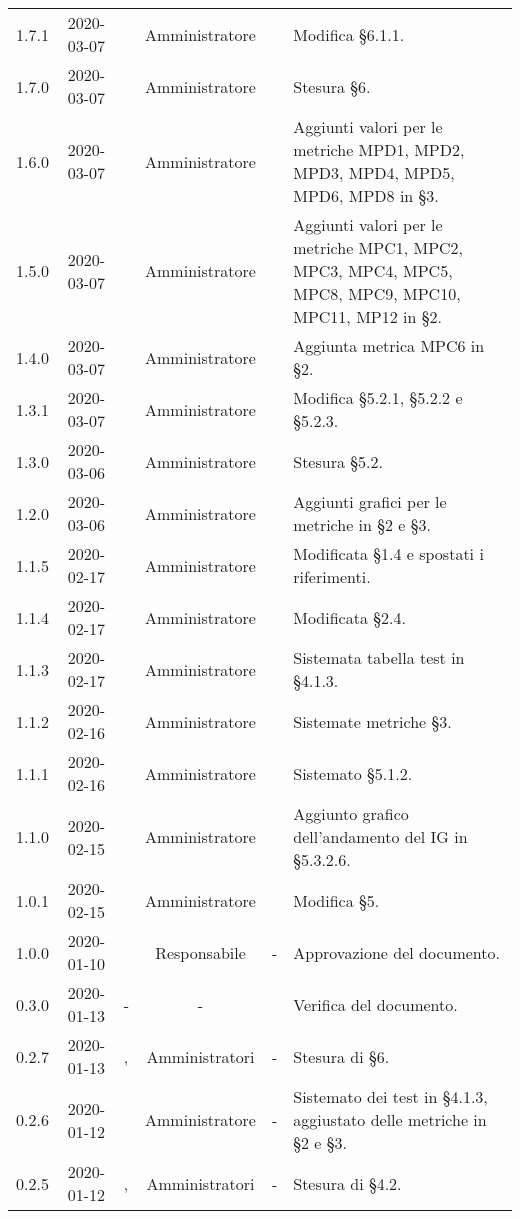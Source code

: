 {\begin{longtable}{ c c  C{2.3cm} c C{3cm} C{3.2cm}}
1.7.1 & 2020-03-07 & \DF{} & Amministratore & \SE{} & Modifica §6.1.1. \\
1.7.0 & 2020-03-07 & \CE{} & Amministratore & \SE{} & Stesura §6. \\
1.6.0 & 2020-03-07 & \CE{} & Amministratore & \AT{} & Aggiunti valori per le metriche MPD1, MPD2, MPD3, MPD4, MPD5, MPD6, MPD8 in §3. \\
1.5.0 & 2020-03-07 & \PF{} & Amministratore & \AT{} & Aggiunti valori per le metriche MPC1, MPC2, MPC3, MPC4, MPC5, MPC8, MPC9, MPC10, MPC11, MP12 in §2. \\
1.4.0 & 2020-03-07 & \DF{} & Amministratore & \AT{} & Aggiunta metrica MPC6 in §2. \\
1.3.1 & 2020-03-07 & \CE{} & Amministratore & \SE{} & Modifica §5.2.1, §5.2.2 e §5.2.3. \\
1.3.0 & 2020-03-06 & \PF{} & Amministratore & \AT{} & Stesura §5.2. \\
1.2.0 & 2020-03-06 & \PF{} & Amministratore & \SE{} & Aggiunti grafici per le metriche in §2 e §3. \\
1.1.5 & 2020-02-17 & \CE{} & Amministratore & \AT{} & Modificata §1.4 e spostati i riferimenti. \\
1.1.4 & 2020-02-17 & \PF{} & Amministratore & \AT{} & Modificata §2.4. \\
1.1.3 & 2020-02-17 & \DF{} & Amministratore & \AT{} & Sistemata tabella test in §4.1.3. \\
1.1.2 & 2020-02-16 & \CE{} & Amministratore & \SE{} & Sistemate metriche §3. \\
1.1.1 & 2020-02-16 & \PF{} & Amministratore & \AT{} & Sistemato §5.1.2. \\
1.1.0 & 2020-02-15 & \PF{} & Amministratore & \SE{} & Aggiunto grafico dell'andamento del IG in §5.3.2.6. \\
1.0.1 & 2020-02-15 & \PF{} & Amministratore & \AT{} & Modifica §5. \\
1.0.0 & 2020-01-10 & \SE{} & Responsabile & - & Approvazione del documento. \\
0.3.0 & 2020-01-13 & - & - & \LD{} & Verifica del documento. \\
0.2.7 & 2020-01-13 & \MC{}, \AT{} & Amministratori & - & Stesura di §6. \\
0.2.6 & 2020-01-12 & \AT{} & Amministratore & - & Sistemato dei test in §4.1.3, aggiustato delle metriche in §2 e §3. \\
0.2.5 & 2020-01-12 & \MC{}, \BR{} & Amministratori & - & Stesura di §4.2. \\

\end{longtable}}
